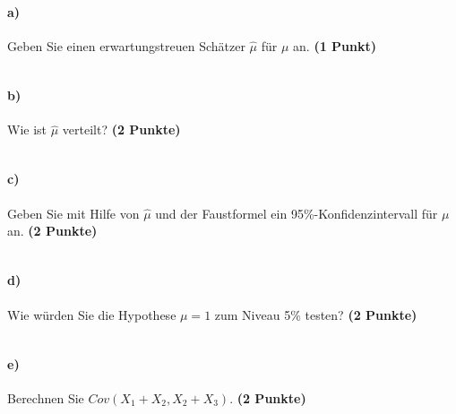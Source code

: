 \documentclass[10pt, a4paper]{article}
\begin{document}
\paragraph{a)} Geben Sie einen erwartungstreuen Schätzer $\hat{\mu}$ für $\mu$ an. \textbf{(1 Punkt)}\\
\begin{tabular}{| p{17cm} |}
    \hline
    \\\hline
\end{tabular}

\paragraph{b)} Wie ist $\hat{\mu}$ verteilt? \textbf{(2 Punkte)}\\
\begin{tabular}{| p{17cm} |}
    \hline
    \\\hline
\end{tabular}

\paragraph{c)} Geben Sie mit Hilfe von $\hat{\mu}$ und der Faustformel ein 95\%-Konfidenzintervall für $\mu$ an. \textbf{(2 Punkte)}\\
\begin{tabular}{| p{17cm} |}
    \hline
    \\\hline
\end{tabular}

\paragraph{d)} Wie würden Sie die Hypothese $\mu= 1$ zum Niveau 5\% testen? \textbf{(2 Punkte)}\\
\begin{tabular}{| p{17cm} |}
    \hline
    \\\hline
\end{tabular}

\paragraph{e)} Berechnen Sie $Cov(X_1+X_2,X_2+X_3)$. \textbf{(2 Punkte)}\\
\begin{tabular}{| p{17cm} |}
    \hline
    \\\hline
\end{tabular}
\end{document}

